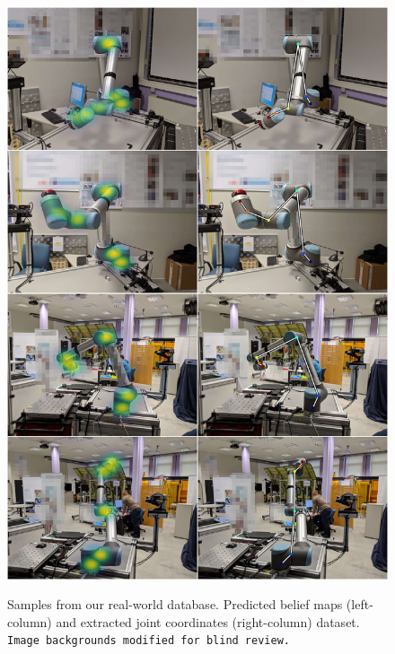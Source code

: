\documentclass[conference]{IEEEtran}
\begin{document}
\begin{figure}[htbp]
{                \includegraphics[width=0.98\columnwidth]{figures/results/ur10_lab/mosaic_blind.jpg}
            \fi
            }
        \caption{
            \label{fig:posresults} Samples from our real-world database. Predicted belief maps (left-column) and extracted joint coordinates (right-column) dataset. 
            \iffinalcopy
            \else
                \texttt{Image backgrounds modified for blind review.}
            \fi
        }
    \end{figure}
\end{document}
